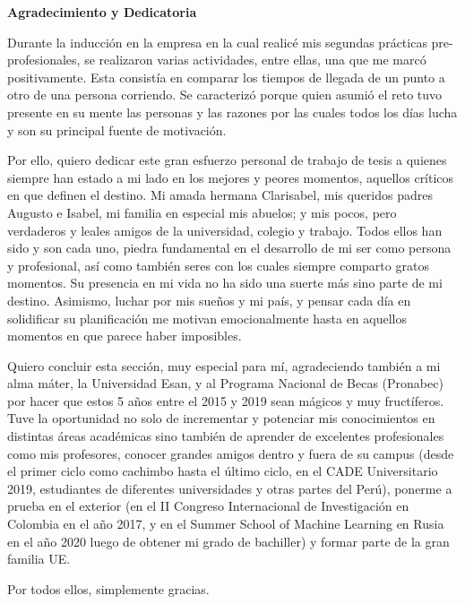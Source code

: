 \begin{center}
	{\Large \bfseries  Agradecimiento y Dedicatoria}
\end{center}
\vspace{0.5cm}

Durante la inducción en la empresa en la cual realicé mis segundas prácticas pre-profesionales, se realizaron varias actividades, entre ellas, una que me marcó positivamente. Esta consistía en comparar los tiempos de llegada de un punto a otro de una persona corriendo. Se caracterizó porque quien asumió el reto tuvo presente en su mente las personas y las razones por las cuales todos los días lucha y son su principal fuente de motivación.

Por ello, quiero dedicar este gran esfuerzo personal de trabajo de tesis a quienes siempre han estado a mi lado en los mejores y peores momentos, aquellos críticos en que definen el destino. Mi amada hermana Clarisabel, mis queridos padres Augusto e Isabel, mi familia en especial mis abuelos; y mis pocos, pero verdaderos y leales amigos de la universidad, colegio y trabajo. Todos ellos han sido y son cada uno, piedra fundamental en el desarrollo de mi ser como persona y profesional, así como también seres con los cuales siempre comparto gratos momentos. Su presencia en mi vida no ha sido una suerte más sino parte de mi destino.
Asimismo, luchar por mis sueños y mi país, y pensar cada día en solidificar su planificación me motivan emocionalmente hasta en aquellos momentos en que parece haber imposibles.

Quiero concluir esta sección, muy especial para mí, agradeciendo también a mi alma máter, la Universidad Esan, y al Programa Nacional de Becas (Pronabec) por hacer que estos 5 años entre el 2015 y 2019 sean mágicos y muy fructíferos. Tuve la oportunidad no solo de incrementar y potenciar mis conocimientos en distintas áreas académicas sino también de aprender de excelentes profesionales como mis profesores, conocer grandes amigos dentro y fuera de su campus (desde el primer ciclo como cachimbo hasta el último ciclo, en el CADE Universitario 2019, estudiantes de diferentes universidades y otras partes del Perú), ponerme a prueba en el exterior (en el II Congreso Internacional de Investigación en Colombia en el año 2017, y en el Summer School of Machine Learning en Rusia en el año 2020 luego de obtener mi grado de bachiller) y formar parte de la gran familia UE.

Por todos ellos, simplemente gracias.
\newline

